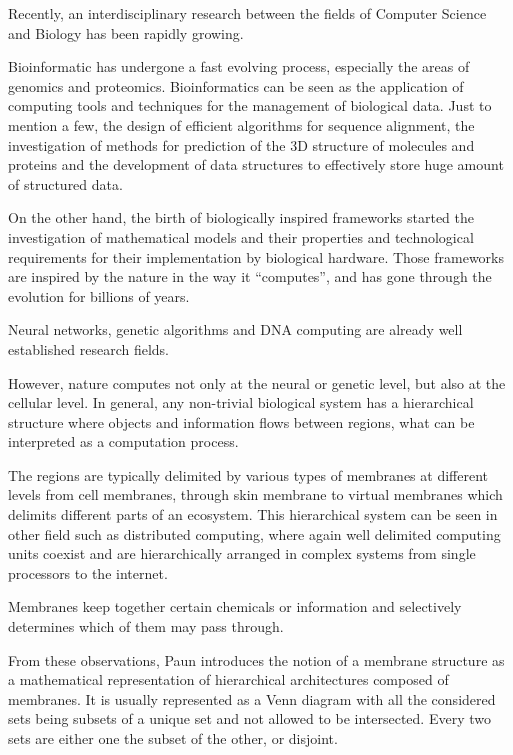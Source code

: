 Recently, an interdisciplinary research between the fields of Computer Science and Biology has been rapidly growing. 


Bioinformatic has undergone a fast evolving process, especially the areas of genomics and proteomics. Bioinformatics can be seen as the application of computing tools and techniques for the management of biological data. Just to mention a few, the design of efficient algorithms for sequence alignment, the investigation of methods for prediction of the 3D structure of molecules and proteins and the development of data structures to effectively store huge amount of structured data.


On the other hand, the birth of biologically inspired frameworks started the investigation of mathematical models and their properties and technological requirements for their implementation by biological hardware.
Those frameworks are inspired by the nature in the way it ``computes'', and has gone through the evolution for billions of years.

Neural networks, genetic algorithms and DNA computing are already well established research fields.

However, nature computes not only at the neural or genetic level, but also at the cellular level. In general, any non-trivial biological system has a hierarchical structure where objects and information flows between regions, what can be interpreted as a computation process.


The regions are typically delimited by various types of membranes at different levels from cell membranes, through skin membrane to virtual membranes which delimits different parts of an ecosystem.
This hierarchical system can be seen in other field such as distributed computing, where again well delimited computing units coexist and are hierarchically arranged in complex systems from single processors to the internet.

Membranes keep together certain chemicals or information and selectively determines which of them may pass through.


From these observations, Paun \cite{Paun98} introduces the notion of a membrane structure as a mathematical representation of hierarchical architectures composed of membranes. It is usually represented as a Venn diagram with all the considered sets being subsets of a unique set and not allowed to be intersected. Every two sets are either one the subset of the other, or disjoint.


